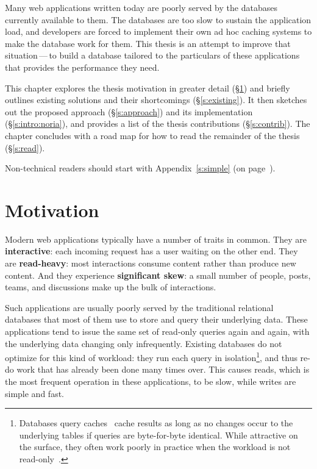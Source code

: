 Many web applications written today are poorly served by the databases currently
available to them. The databases are too slow to sustain the application load,
and developers are forced to implement their own ad hoc caching systems to make
the database work for them. This thesis is an attempt to improve that
situation\,---\,to build a database tailored to the particulars of these
applications that provides the performance they need.

This chapter explores the thesis motivation in greater detail
(\S\ref{s:motivation}) and briefly outlines existing solutions and their
shortcomings (\S\ref{s:existing}). It then sketches out the proposed approach
(\S\ref{s:approach}) and its implementation (\S\ref{s:intro:noria}), and
provides a list of the thesis contributions (\S\ref{s:contrib}). The chapter
concludes with a road map for how to read the remainder of the thesis
(\S\ref{s:read}).

Non-technical readers should start with Appendix~\ref{s:simple} (on
page~\pageref{s:simple}).

\section{Motivation}
\label{s:motivation}

Modern web applications typically have a number of traits in common. They are
\textbf{interactive}: each incoming request has a user waiting on the other end.
They are \textbf{read-heavy}: most interactions consume content rather than
produce new content. And they experience \textbf{significant skew}: a small
number of people, posts, teams, and discussions make up the bulk of
interactions.

Such applications are usually poorly served by the traditional relational
databases that most of them use to store and query their underlying data. These
applications tend to issue the same set of read-only queries again and again,
with the underlying data changing only infrequently. Existing databases do not
optimize for this kind of workload: they run each query in
isolation\footnote{Databases query caches~\cite{mysql-query-cache,
pgpool-query-cache} cache results as long as no changes occur to the underlying
tables if queries are byte-for-byte identical. While attractive on the surface,
they often work poorly in practice when the workload is not
read-only~\cite{mysql-query-cache-nope,pgpool-query-cache}.}, and thus re-do
work that has already been done many times over. This causes reads, which is the
most frequent operation in these applications, to be slow, while writes are
simple and fast.

